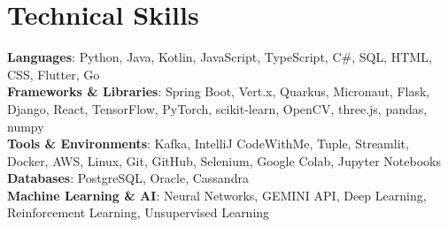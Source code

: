 \documentclass[letterpaper,10pt]{article}
\begin{document}
\section{Technical Skills}
 \begin{itemize}[leftmargin=0.15in, label={}]
    \small{\item{
     \textbf{Languages}{: Python, Java, Kotlin, JavaScript, TypeScript, C\#, SQL, HTML, CSS, Flutter, Go} \\
     \textbf{Frameworks \& Libraries}{: Spring Boot, Vert.x, Quarkus, Micronaut, Flask, Django, React, TensorFlow, PyTorch, scikit-learn, OpenCV, three.js, pandas, numpy} \\
     \textbf{Tools \& Environments}{: Kafka, IntelliJ CodeWithMe, Tuple, Streamlit, Docker, AWS, Linux, Git, GitHub, Selenium, Google Colab, Jupyter Notebooks} \\
     \textbf{Databases}{: PostgreSQL, Oracle, Cassandra} \\
     \textbf{Machine Learning \& AI}{: Neural Networks, GEMINI API, Deep Learning, Reinforcement Learning, Unsupervised Learning} \\
    }}
 \end{itemize}
\end{document}
